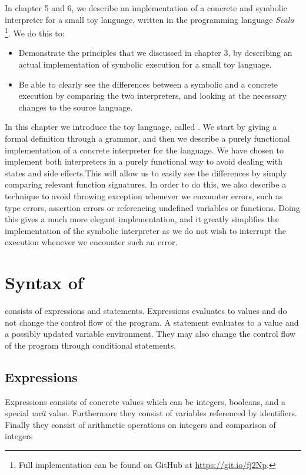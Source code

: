 
In chapter 5 and 6, we describe an implementation of a concrete and symbolic interpreter for a small toy language, written in the programming language \textsl{Scala} \footnote{Full implementation can be found on GitHub at \url{https://git.io/fj2Np}.}. We do this to: 
\begin{itemize}
	\item Demonstrate the principles that we discussed in chapter 3, by describing an actual implementation of symbolic execution for a small toy language.
	\item Be able to clearly see the differences between a symbolic and a concrete execution by comparing the two interpreters, and looking at the necessary changes to the source language. 
\end{itemize} 

In this chapter we introduce the toy language, called \explanguage. We start by giving a formal definition through a grammar, and then we describe a purely functional implementation of a concrete interpreter for the language. We have chosen to implement both interpreters in a purely functional way to avoid dealing with states and side effects.This will allow us to easily see the differences by simply comparing relevant function signatures. In order to do this, we also describe a technique to avoid throwing exception whenever we encounter errors, such as type errors, assertion errors or referencing undefined variables or functions. Doing this gives a much more elegant implementation, and it greatly simplifies the implementation of the symbolic interpreter as we do not wish to interrupt the execution whenever we encounter such an error.

\section{Syntax of \explanguage}

\explanguage consists of expressions and statements. Expressions evaluates to values and do not change the control flow of the program. A statement evaluates to a value and a possibly updated variable environment. They may also change the control flow of the program through conditional statements.
 

\subsection{Expressions}


Expressions consists of concrete values which can be integers, booleans, and a special \textsl{unit} value. Furthermore they consist of variables referenced by identifiers. Finally they consist of arithmetic operations on integers and comparison of integers 

